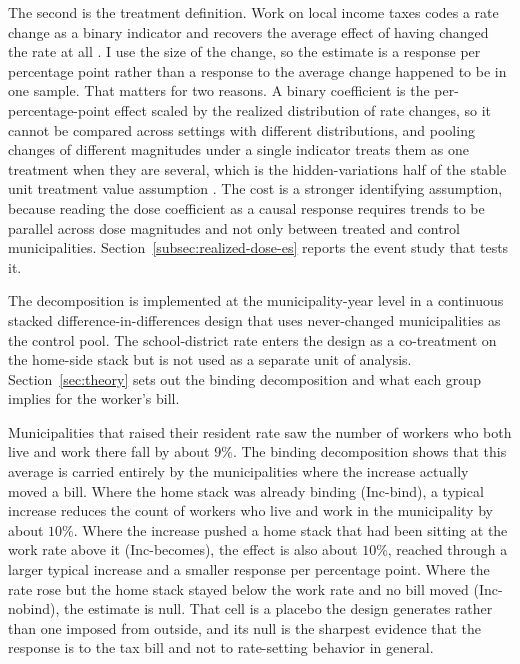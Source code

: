 \documentclass[12pt]{article}
\begin{document}
The second is the treatment definition. Work on local income taxes codes a rate change as a binary indicator and recovers the average effect of having changed the rate at all \citep{yangRESPONSIVENESSINCOMELOCAL2017, yushkovLocalIncomeTaxes2025}. I use the size of the change, so the estimate is a response per percentage point rather than a response to the average change happened to be in one sample. That matters for two reasons. A binary coefficient is the per-percentage-point effect scaled by the realized distribution of rate changes, so it cannot be compared across settings with different distributions, and pooling changes of different magnitudes under a single indicator treats them as one treatment when they are several, which is the hidden-variations half of the stable unit treatment value assumption \citep[ch.~1]{imbensCausalInferenceStatistics2015}. The cost is a stronger identifying assumption, because reading the dose coefficient as a causal response requires trends to be parallel across dose magnitudes and not only between treated and control municipalities. Section~\ref{subsec:realized-dose-es} reports the event study that tests it.

The decomposition is implemented at the municipality-year level in
a continuous stacked difference-in-differences design that uses
never-changed municipalities as the control pool. The
school-district rate enters the design as a co-treatment on the
home-side stack but is not used as a separate unit of analysis.
Section~\ref{sec:theory} sets out the binding decomposition and what
each group implies for the worker's bill.

Municipalities that raised their resident rate saw the number of workers who both live and work there fall by about $9\%$. The binding decomposition shows that this average is carried entirely by the municipalities where the increase actually moved a bill. Where the home stack was already binding (Inc-bind), a typical increase reduces the count of workers who live and work in the municipality by about $10\%$. Where the increase pushed a home stack that had been sitting at the work rate above it (Inc-becomes), the effect is also about $10\%$, reached through a larger typical increase and a smaller response per percentage point. Where the rate rose but the home stack stayed below the work rate and no bill moved (Inc-nobind), the estimate is null. That cell is a placebo the design generates rather than one imposed from outside, and its null is the sharpest evidence that the response is to the tax bill and not to rate-setting behavior in general.
\end{document}
